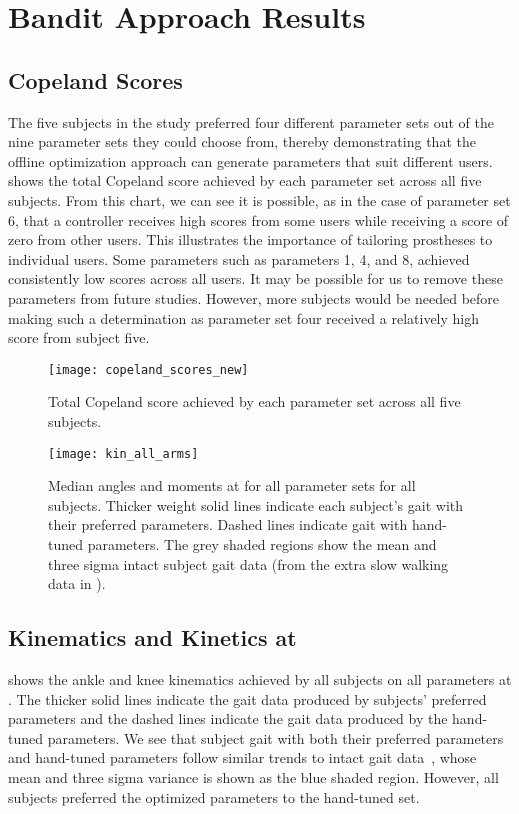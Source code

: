 \section{Bandit Approach Results} 

\subsection{Copeland Scores}

The five subjects in the study preferred four different parameter sets out of
the nine parameter sets they could choose from, thereby demonstrating that the
offline optimization approach can generate parameters that suit different users.
 shows the total Copeland score achieved by each parameter
set across all five subjects. From this chart, we can see it is possible, as in
the case of parameter set 6, that a controller receives high scores from some
users while receiving a score of zero from other users. This illustrates the
importance of tailoring prostheses to individual users. Some parameters such as
parameters 1, 4, and 8, achieved consistently low scores across all users. It
may be possible for us to remove these parameters from future studies. However,
more subjects would be needed before making such a determination as parameter
set four received a relatively high score from subject five.

\begin{figure}[b]
    \centering
    \texttt{[image: copeland\_scores\_new]}
    \caption{Total Copeland score achieved by each parameter set across all five
    subjects.}\label{fig:copeland}
\end{figure}

\begin{figure}[t]
    \centering
    \texttt{[image: kin\_all\_arms]}
    \caption[Median angles and moments for all parameter sets for all
    subjects.]{Median angles and moments at  for all
    parameter sets for all subjects. Thicker weight solid lines indicate each
    subject's gait with their preferred parameters. Dashed lines indicate gait
    with hand-tuned parameters. The grey shaded regions show the mean and three
    sigma intact subject gait data (from the extra slow walking data in
    \citep{bovi2011multiple}).}\label{fig:kin_all_arms} 
\end{figure}

\subsection{Kinematics and Kinetics at }
 shows the ankle and knee kinematics achieved by all
subjects on all parameters at . The thicker solid lines
indicate the gait data produced by subjects' preferred parameters and the dashed
lines indicate the gait data produced by the hand-tuned parameters. We see that
subject gait with both their preferred parameters and hand-tuned parameters
follow similar trends to intact gait data~\citep{bovi2011multiple}, whose mean
and three sigma variance is shown as the blue shaded region. However, all
subjects preferred the optimized parameters to the hand-tuned set. 

